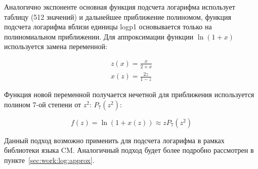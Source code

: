 Аналогично экспоненте основная функция подсчета логарифма использует таблицу (512 значений) и дальнейшее приближение полиномом, функция подсчета логарифма вблизи единицы logp1 основывается только на полиномиальном приближении.
Для аппроксимации функции $\ln{(1 + x)}$ используется замена переменной:

\begin{align}
    z(x) = \frac{x}{2+x} \\
    x(z) = \frac{2z}{1-z}
\end{align}

Функция новой переменной получается нечетной для приближения используется полином 7-ой степени от $z^{2}$: $P_{7}(z^{2})$:

\begin{equation}
    f(z) = \ln{(1 + x(z))} \approx z P_{7}(z^{2})
\end{equation}

Данный подход возможно применить для подсчета логарифма в рамках библиотеки языка CM.
Аналогичный подход будет более подробно рассмотрен в пункте~\ref{sec:work:log:approx}.
